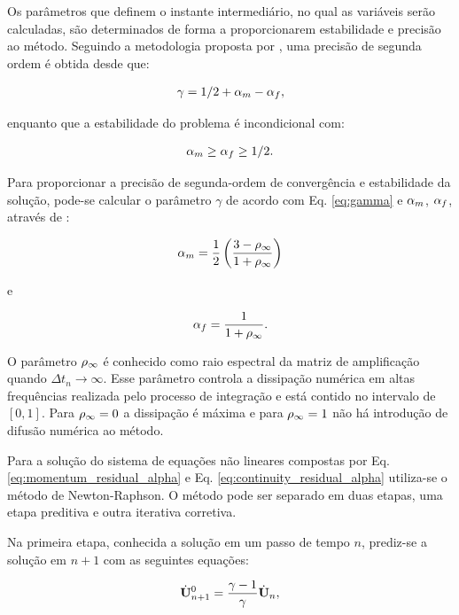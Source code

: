 \documentclass[tese_patricia]{subfiles}%
\begin{document}
Os parâmetros que definem o instante intermediário, no qual as variáveis serão calculadas, são determinados de forma a proporcionarem estabilidade e precisão ao método. Seguindo a metodologia proposta por , uma precisão de segunda ordem é obtida desde que: 

\begin{gather}
\gamma = 1/2 + \alpha_m - \alpha_f,\label{eq:gamma}
\end{gather}

\noindent enquanto que a estabilidade do problema é incondicional com:

\begin{gather}
\alpha_m \ge \alpha_f \ge 1/2.
\end{gather}

Para proporcionar a precisão de segunda-ordem de convergência e estabilidade da solução, pode-se calcular o parâmetro $\gamma$ de acordo com Eq. \ref {eq:gamma} e $\alpha_m$, $\alpha_f$, através de \cite{Hughes:2000}:


\begin{gather}
\alpha_m = \frac{1}{2}\left(\frac{3 - \rho_\infty}{1+\rho_\infty}\right)\label{eq:alpha_m_fluid}\\
\end{gather}

\noindent e

\begin{gather}
\alpha_f = \frac{1}{1+\rho_\infty}\label{eq:alpha_f_fluid}.
\end{gather}

O parâmetro $\rho_\infty$ é conhecido como raio espectral da matriz de amplificação quando $\Delta t_{n} \rightarrow \infty$. Esse parâmetro controla a dissipação numérica em altas frequências realizada pelo processo de integração e está contido no intervalo de $[0,1]$. Para $\rho_\infty = 0$ a dissipação é máxima e para $\rho_\infty = 1$ não há introdução de difusão numérica ao método.

Para a solução do sistema de equações não lineares compostas por Eq. \eqref{eq:momentum_residual_alpha} e Eq. \eqref{eq:continuity_residual_alpha} utiliza-se o método de Newton-Raphson. O método pode ser separado em duas etapas, uma etapa preditiva e outra iterativa corretiva.

Na primeira etapa, conhecida a solução em um passo de tempo $n$, prediz-se a solução em $n+1$ com as seguintes equações:

\begin{align}
\dot{\mathbf{U}}_{n+1}^{0} = \frac{\gamma-1}{\gamma}\dot{\mathbf{U}}_{n} \label{eq:Pred1},
\end{align}
\end{document}
